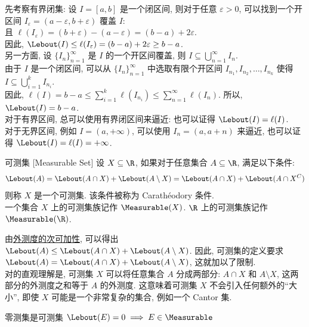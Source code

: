 \begin{prf}
    先考察有界闭集: 设 \(I=[a,b]\) 是一个闭区间, 则对于任意 \(\varepsilon > 0\), 可以找到一个开区间 \(I_\varepsilon = (a-\varepsilon, b+\varepsilon)\) 覆盖 \(I\):\\
    且 \(\ell(I_\varepsilon) = (b+\varepsilon) - (a-\varepsilon) = (b-a) + 2\varepsilon\).\\
    因此, \(\Lebout(I) \leq \ell(I_\varepsilon) = (b-a) + 2\varepsilon\geq b-a\).\\
    另一方面, 设 \(\{I_n\}_{n=1}^\infty\) 是 \(I\) 的一个开区间覆盖, 则 \(I \subseteq \bigcup_{n=1}^\infty I_n\).\\
    由于 \(I\) 是一个闭区间, 可以从 \(\{I_n\}_{n=1}^\infty\) 中选取有限个开区间 \(I_{n_1}, I_{n_2}, \ldots, I_{n_k}\) 使得 \(I \subseteq \bigcup_{i=1}^k I_{n_i}\).\\
    因此, \(\ell(I) = b-a \leq \sum_{i=1}^k \ell(I_{n_i}) \leq \sum_{n=1}^\infty \ell(I_n)\). 所以, \(\Lebout(I) = b-a\).\\
    对于有界区间, 总可以使用有界闭区间来逼近: 也可以证得 \(\Lebout(I) = \ell(I)\).\\
    对于无界区间, 例如 \(I=(a,+\infty)\), 可以使用 \(I_n=(a, a+n)\) 来逼近, 也可以证得 \(\Lebout(I) = \ell(I) = +\infty\).
\end{prf}
\begin{dfn}
    {可测集}
    [Measurable Set]
    设 \(X\subseteq\R\), 如果对于任意集合 \(A\subseteq\R\), 满足以下条件:
    \[\Lebout(A) = \Lebout(A\cap X) + \Lebout(A\setminus X) = \Lebout(A\cap X) + \Lebout(A\cap X^C)\]
    则称 \(X\) 是一个可测集. 该条件被称为 Carathéodory 条件.\\
    一个集合 \(X\) 上的可测集族记作 \(\Measurable(X)\). \(\R\) 上的可测集族记作 \(\Measurable(\R)\).
\end{dfn}
\begin{rmk}
    由\hyperref[ppt:lebesgue-outer-measure-countable-subadditivity]{外测度的次可加性}, 可以得出 \(\Lebout(A) \leq \Lebout(A\cap X) + \Lebout(A\setminus X)\). 因此, 可测集的定义要求 \(\Lebout(A) = \Lebout(A\cap X) + \Lebout(A\setminus X)\), 这就加以了限制.\\
    对\MeasurableSet{}的直观理解是, 可测集 \(X\) 可以将任意集合 \(A\) 分成两部分: \(A\cap X\) 和 \(A\setminus X\), 这两部分的外测度之和等于 \(A\) 的外测度. 这意味着可测集 \(X\) 不会引入任何额外的``大小'', 即使 \(X\) 可能是一个非常复杂的集合, 例如一个 Cantor 集.
\end{rmk}
\begin{ppt}
    {零测集是可测集}
    \(\Lebout(E)=0\implies E\in\Measurable\)
\end{ppt}
